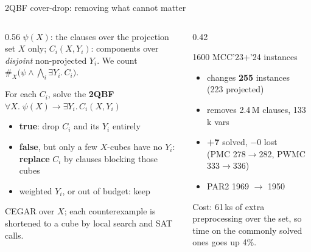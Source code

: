 \documentclass[aspectratio=169]{beamer}
\begin{document}
\appendix

\begin{frame}{2QBF cover-drop: removing what cannot matter}
  \begin{columns}[T]
    \begin{column}{0.56\textwidth}
      \small
      $\psi(X)$: the clauses over the projection set $X$ only;
      $C_i(X, Y_i)$: components over \emph{disjoint} non-projected $Y_i$.
      We count $\#_X\big(\psi \land \textstyle\bigwedge_i \exists Y_i.\, C_i\big)$.
      \smallskip

      For each $C_i$, solve the \textbf{2QBF}
      \ $\forall X.\; \psi(X) \rightarrow \exists Y_i.\, C_i(X, Y_i)$
      \begin{itemize}
        \item \textbf{true}: drop $C_i$ and its $Y_i$ entirely
        \item \textbf{false}, but only a few $X$-cubes have no $Y_i$:
          \textbf{replace} $C_i$ by clauses blocking those cubes
        \item weighted $Y_i$, or out of budget: keep
      \end{itemize}
      \scriptsize CEGAR over $X$; each counterexample is shortened to a
      cube by local search and SAT calls.
    \end{column}
    \begin{column}{0.42\textwidth}
      \begin{exampleblock}{\small 1600 MCC'23+'24 instances}
        \small
        \begin{itemize}
          \item changes \textbf{255} instances\\
            (223 projected)
          \item removes 2.4\,M clauses, 133\,k vars
          \item \textbf{+7} solved, $-0$ lost\\
            (PMC 278$\to$282, PWMC 333$\to$336)
          \item PAR2 1969 $\to$ 1950
        \end{itemize}
      \end{exampleblock}
      \scriptsize Cost: 61\,ks of extra preprocessing over the set, so
      time on the commonly solved ones goes up 4\%.
    \end{column}
  \end{columns}
\end{frame}
\end{document}
